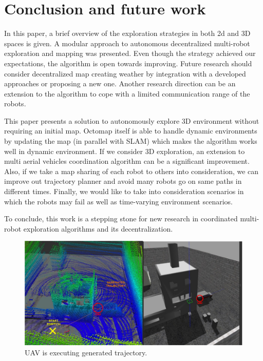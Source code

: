 \section{Conclusion and future work} \label{sec:conclusion}

In this paper, a brief overview of the exploration strategies in both 2d and 3D spaces is given. A modular approach to autonomous decentralized multi-robot exploration and mapping was presented. Even though the strategy achieved our expectations, the algorithm is open towards improving. Future research should consider decentralized map creating weather by integration with a developed approaches or proposing a new one. Another research direction can be an extension to the algorithm to cope with a limited communication range of the robots.

This paper presents a solution to autonomously explore 3D environment without requiring an initial map. Octomap itself is able to handle dynamic environments by updating the map (in parallel with SLAM) which makes the algorithm works well in dynamic environment.
If we consider 3D exploration, an extension to multi aerial vehicles coordination algorithm can be a significant improvement. Also, if we take a map sharing of each robot to others into consideration, we can improve out trajectory planner and avoid many robots go on same paths in different times. Finally, we would like to take into consideration scenarios in which the robots may fail as well as time-varying environment scenarios.

To conclude, this work is a stepping stone for new research in coordinated multi-robot exploration algorithms and its decentralization.

\begin{figure}[t]
	\centering
	\includegraphics[width=1.0\columnwidth]{./pictures/rviz_gazebo.pdf}	
	\caption{UAV is executing generated trajectory.}
	\label{fig:rviz_gazebo}
\end{figure}